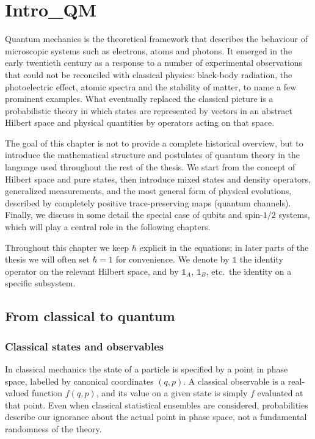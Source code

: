\chapter{Intro_QM}
\label{chap:foundations_qm}

Quantum mechanics is the theoretical framework that describes the behaviour of microscopic systems such as electrons, atoms and photons. 
It emerged in the early twentieth century as a response to a number of experimental observations that could not be reconciled with classical physics: black-body radiation, the photoelectric effect, atomic spectra and the stability of matter, to name a few prominent examples. 
What eventually replaced the classical picture is a probabilistic theory in which states are represented by vectors in an abstract Hilbert space and physical quantities by operators acting on that space.

The goal of this chapter is not to provide a complete historical overview, but to introduce the mathematical structure and postulates of quantum theory in the language used throughout the rest of the thesis. 
We start from the concept of Hilbert space and pure states, then introduce mixed states and density operators, generalized measurements, and the most general form of physical evolutions, described by completely positive trace-preserving maps (quantum channels). 
Finally, we discuss in some detail the special case of qubits and spin-$1/2$ systems, which will play a central role in the following chapters.

Throughout this chapter we keep $\hbar$ explicit in the equations; in later parts of the thesis we will often set $\hbar = 1$ for convenience. 
We denote by $\mathbb{1}$ the identity operator on the relevant Hilbert space, and by $\mathbb{1}_A$, $\mathbb{1}_B$, etc.\ the identity on a specific subsystem.

\section{From classical to quantum}

\subsection{Classical states and observables}

In classical mechanics the state of a particle is specified by a point in phase space, labelled by canonical coordinates $(q,p)$. 
A classical observable is a real-valued function $f(q,p)$, and its value on a given state is simply $f$ evaluated at that point. 
Even when classical statistical ensembles are considered, probabilities describe our ignorance about the actual point in phase space, not a fundamental randomness of the theory.

